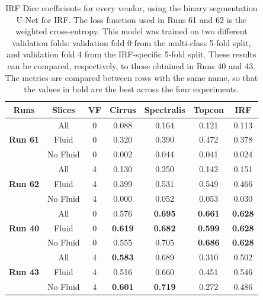\begin{table}[!ht]
	\caption{IRF Dice coefficients for every vendor, using the binary segmentation U-Net for IRF. The loss function used in Runs 61 and 62 is the weighted cross-entropy. This model was trained on two different validation folds: validation fold 0 from the multi-class 5-fold split, and validation fold 4 from the IRF-specific 5-fold split. These results can be compared, respectively, to those obtained in Runs 40 and 43. The metrics are compared between rows with the same name, so that the values in bold are the best across the four experiments.}
	\centering
	\begin{tabular}{|c|c|c|c|c|c|c|}
			\hline
			\textbf{Runs} &
			\textbf{Slices} &  
			\textbf{VF} & 
			\textbf{Cirrus} & 
			\textbf{Spectralis} & 
			\textbf{Topcon} & 
			\textbf{IRF} \\ 
			
			\hline
			
			\multirow{3}{*}{\textbf{Run 61}} & All & 0 & 0.088 & 0.164 & 0.121 & 0.113 \\
			
			& Fluid & 0 & 0.320 & 0.390 & 0.472 & 0.378 \\
			
			& No Fluid & 0 & 0.002 & 0.044 & 0.041 & 0.024 \\
			
			\hline
			
			\multirow{3}{*}{\textbf{Run 62}} & All & 4 & 0.130 & 0.250 & 0.142 & 0.151 \\
			
			& Fluid & 4 & 0.399 & 0.531 & 0.549 & 0.466 \\
						
			& No Fluid & 4 & 0.000 & 0.052 & 0.053 & 0.030 \\
			
			\hline
			\hline
			
			\multirow{3}{*}{\textbf{Run 40}} & All & 0 & 0.576 & \textbf{0.695} & \textbf{0.661} & \textbf{0.628} \\
			
			& Fluid & 0 & \textbf{0.619} & \textbf{0.682} & \textbf{0.599} & \textbf{0.628} \\
			
			& No Fluid & 0 & 0.555 & 0.705 & \textbf{0.686} & \textbf{0.628} \\
			
			\hline
			
			\multirow{3}{*}{\textbf{Run 43}} & All & 4 & \textbf{0.583} & 0.689 & 0.310 & 0.502 \\
			
			& Fluid & 4 & 0.516 & 0.660 & 0.451 & 0.546 \\
			
			& No Fluid & 4 & \textbf{0.601} & \textbf{0.719} & 0.272 & 0.486 \\
			
			\hline
			
	\end{tabular}
	\label{tab:Experiment2.2Results}
\end{table}

